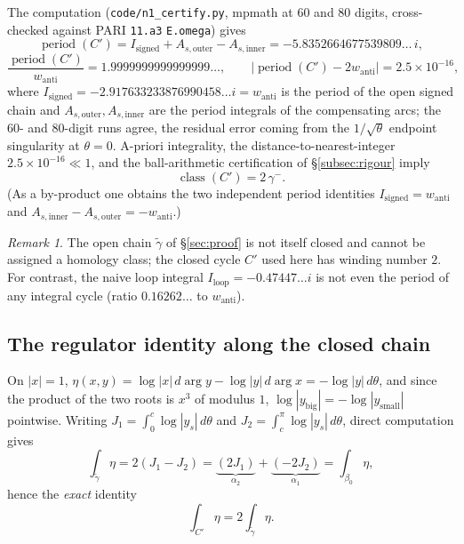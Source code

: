 \documentclass[preprint,12pt]{elsarticle}
\theoremstyle{definition}
\theoremstyle{remark}
\newtheorem{remark}[theorem]{Remark}
\DeclareMathOperator{\period}{period}
\DeclareMathOperator{\class}{class}
\begin{document}
The computation (\texttt{code/n1\_certify.py}, mpmath at $60$ and $80$
digits, cross-checked against PARI \texttt{11.a3} \texttt{E.omega}) gives
\begin{equation}\label{eq:period}
  \period(C')=I_{\mathrm{signed}}+A_{s,\mathrm{outer}}-A_{s,\mathrm{inner}}
  =-5.8352664677539809\ldots\,i,
\end{equation}
\[
  \frac{\period(C')}{w_{\mathrm{anti}}}=1.9999999999999999\ldots,\qquad
  \big|\period(C')-2w_{\mathrm{anti}}\big|=2.5\times10^{-16},
\]
where $I_{\mathrm{signed}}=-2.917633233876990458\ldots i=w_{\mathrm{anti}}$
is the period of the open signed chain and
$A_{s,\mathrm{outer}},A_{s,\mathrm{inner}}$ are the period integrals of the
compensating arcs; the $60$- and $80$-digit runs agree, the residual error
coming from the $1/\sqrt\theta$ endpoint singularity at $\theta=0$. A-priori
integrality, the distance-to-nearest-integer $2.5\times10^{-16}\ll 1$, and
the ball-arithmetic certification of \S\ref{subsec:rigour} imply
\[
  \boxed{\class(C')=2\,\gamma^-}.
\]
(As a by-product one obtains the two independent period identities
$I_{\mathrm{signed}}=w_{\mathrm{anti}}$ and
$A_{s,\mathrm{inner}}-A_{s,\mathrm{outer}}=-w_{\mathrm{anti}}$.)

\begin{remark}
The open chain $\tilde\gamma$ of \S\ref{sec:proof} is not itself closed
and cannot be assigned a homology class; the closed cycle $C'$ used here
has winding number $2$. For
contrast, the naive loop integral $I_{\mathrm{loop}}=-0.47447\ldots i$ is not
even the period of any integral cycle (ratio $0.16262\ldots$ to
$w_{\mathrm{anti}}$).
\end{remark}

\subsection{The regulator identity along the closed chain}

On $|x|=1$, $\eta(x,y)=\log|x|\,d\arg y-\log|y|\,d\arg x=-\log|y|\,d\theta$,
and since the product of the two roots is $x^3$ of modulus $1$,
$\log|y_{\mathrm{big}}|=-\log|y_{\mathrm{small}}|$ pointwise. Writing
$J_1=\int_0^c\log|y_s|\,d\theta$ and $J_2=\int_c^\pi\log|y_s|\,d\theta$,
direct computation gives
\[
  \int_{\tilde\gamma}\eta=2(J_1-J_2)
  =\underbrace{(2J_1)}_{\alpha_2}+\underbrace{(-2J_2)}_{\alpha_1}
  =\int_{\beta_0}\eta,
\]
hence the \emph{exact} identity
\begin{equation}\label{eq:double}
  \int_{C'}\eta=2\int_{\tilde\gamma}\eta.
\end{equation}
\end{document}
